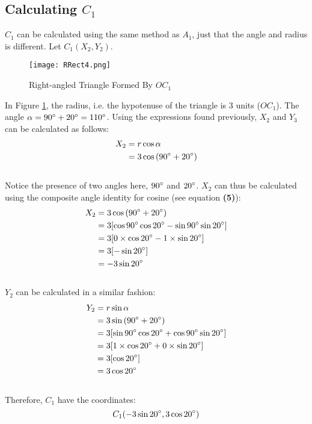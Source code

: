 \documentclass{article}
\begin{document}
        \subsection{Calculating $C_1$} $C_1$ can be calculated using the same method as $A_1$, just that the angle and radius is different. Let $C_1(X_2, Y_2)$.
        \begin{figure}[h!]
            \texttt{[image: RRect4.png]}
            \caption{Right-angled Triangle Formed By $OC_1$}
            \label{fig:rrect4}
        \end{figure}  \newpage
        In Figure \ref{fig:rrect4}, the radius, i.e. the hypotenuse of the triangle is 3 units ($OC_1$). The angle $\alpha = 90\degree + 20\degree = 110\degree$. Using the expressions found previously, $X_2$ and $Y_3$ can be calculated as follows:
        \begin{align*}
            X_2 &= r\cos{\alpha} \\
            &= 3\cos{(90\degree + 20\degree)}
        \end{align*} \\
        Notice the presence of two angles here, $90\degree$ and $20\degree$. $X_2$ can thus be calculated using the composite angle identity for cosine (see equation \textbf{(5)}):
        \begin{align*}
            X_2 &= 3\cos{(90\degree + 20\degree)} \\
            &= 3[\cos{90\degree}\cos{20\degree} - \sin{90\degree}\sin{20\degree}] \\
            &= 3[0\times\cos{20\degree} - 1\times\sin{20\degree}] \\
            &= 3[-\sin{20\degree}] \\
            &= -3\sin{20\degree}
        \end{align*}\\
        $Y_2$ can be calculated in a similar fashion:
        \begin{align*}
            Y_2 &= r\sin{\alpha} \\
            &= 3\sin{(90\degree + 20\degree)} \\
            &= 3[\sin{90\degree}\cos{20\degree} + \cos{90\degree}\sin{20\degree}] \\
            &= 3[1\times\cos{20\degree} + 0\times\sin{20\degree}] \\
            &= 3[\cos{20\degree}] \\
            &= 3\cos{20\degree}
        \end{align*} \\
        Therefore, $C_1$ have the coordinates:
        \begin{equation}
            C_1(-3\sin{20\degree}, 3\cos{20\degree})
        \end{equation}
\end{document}
